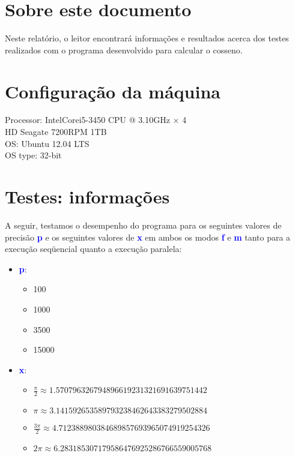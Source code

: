 \documentclass[11pt]{article}
\begin{document}
\section{Sobre este documento}
\indent\indent Neste relatório, o leitor encontrará informações e resultados acerca dos testes realizados com o programa desenvolvido para calcular o cosseno.

\section{Configuração da máquina}
Processor: Intel\textregistered Core\texttrademark i5-3450 CPU @ 3.10GHz $\times$ 4 \\
HD Seagate 7200RPM 1TB \\
OS: Ubuntu 12.04 LTS\\
OS type: 32-bit

\section{Testes: informações}

A seguir, testamos o desempenho do programa para os seguintes valores de precisão \textbf{\textcolor{blue}{p}} e os seguintes valores de \textbf{\textcolor{blue}{x}} em ambos os modos \textbf{\textcolor{blue}{f}} e \textbf{\textcolor{blue}{m}} tanto para a execução seqüencial quanto a execução paralela:
\begin{itemize}
	\item \textbf{\textcolor{blue}{p}}:
	\begin{itemize}
		\item 100
		\item 1000
		\item 3500
		\item 15000
	\end{itemize}
	\item \textbf{\textcolor{blue}{x}}:
	\begin{itemize}
		\item $\frac{\pi}{2} \approx 1.570796326794896619231321691639751442$
		\item $\pi \approx 3.141592653589793238462643383279502884$
		\item $\frac{3\pi}{2} \approx 4.712388980384689857693965074919254326$
		\item $2\pi \approx 6.283185307179586476925286766559005768$
	\end{itemize}
\end{itemize}
\end{document}
